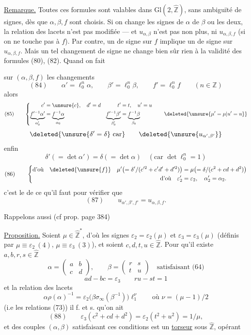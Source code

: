 \uline{Remarque.} Toutes ces formules sont valables dans $\mathrm{Gl}(2,\widehat{\mathbb Z})$, sans ambiguïté de signes, dès que $\alpha,\beta,f$ sont choisis. Si on change les signes de $\alpha$  de $\beta$ ou les deux, la relation des lacets n'est pas modifiée --- et $u_{\alpha,\beta}$ n'est pas  non plus,  ni $u_{\alpha,\beta,f}$ (si on ne touche pas à $f$). Par contre, un  de signe sur $f$ implique un  de signe sur $u_{\alpha,\beta,f}$. Mais un tel changement de signe ne change bien sûr rien à la validité des formules (80), (82). Quand on fait


sur $(\alpha,\beta,f)$ les changements 
\[
(84)\qquad
\alpha'=\ell_0^n\alpha,\qquad\beta'=\ell_0^n\beta,\qquad f'=\ell_0^n f
\qquad(n\in\mathbb Z)
\]
alors 
\[
(85)\qquad
\left\{\begin{aligned}
c'&=\unsure{c},\quad d'=d& t'&=t,\quad u'=u\\
\underbrace{f'^{-1}\alpha'}_{\alpha'_0}&=\underbrace{f^{-1}\alpha}_{\alpha_0}&
\underbrace{f'^{-1}\beta'}_{\beta'_0}&=\underbrace{f^{-1}\beta}_{\beta_0}
\end{aligned}\right.
\qquad\deleted{\unsure{\mu'=\mu|u'=u}}
\]
\[
\deleted{\unsure{\delta'=\delta}\text{ car}}
\qquad\deleted{\unsure{u_{\alpha',\beta'}}}
\]
enfin
\[
\delta'(=\det\alpha')=\delta(=\det\alpha)\quad(\text{car }\det \ell_0^n=1)
\]
\[
(86)\qquad
\left\{\begin{aligned}
\text{d'où}\quad\deleted{\unsure{f}}\quad
\mu'\bigl(=\delta'/(c'^2+c'd'+d'^2)\bigr)&=\mu\bigl(=\delta/(c^2+cd+d^2)\bigr)\\
\text{d'où}\quad\varepsilon'_2&=\varepsilon_2,\quad\alpha'_2=\alpha_2.
\end{aligned}\right.
\]
c'est le  de ce qu'il faut pour vérifier  que
\[
(87)\qquad u_{\alpha',\beta',f'}=u_{\alpha,\beta,f}.
\]

Rappelons aussi (cf prop. page 384)

\uline{Proposition.} Soient $\mu\in\widehat{\mathbb Z}^*$, d'où les signes $\varepsilon_2=\varepsilon_2(\mu)$ et $\varepsilon_3=\varepsilon_3(\mu)$ (définis par $\mu\equiv\varepsilon_2\ (4)$, $\mu\equiv\varepsilon_3\ (3)$), et soient $c,d,t,u\in\widehat{\mathbb Z}$. Pour qu'il existe $a,b,r,s\in\widehat{\mathbb Z}$
\[
\alpha=\begin{pmatrix}a&b\\c&d\end{pmatrix},\qquad
\beta=\begin{pmatrix}r&s\\t&u\end{pmatrix}
\quad\text{satisfaisant (64)}
\]
\[
ad-bc=\varepsilon_3\qquad ru-st=1
\]
et la relation des lacets
\[
\alpha\rho(\alpha)^{-1}=\varepsilon_2\bigl(\beta\sigma_\infty(\beta^{-1})\bigr)\ell_1^\nu
\qquad\text{où }\nu=(\mu-1)/2
\]
(i.e les relations (73)) il f. et s. qu'on ait
\[
(88)\qquad\varepsilon_3(c^2+cd+d^2)=\varepsilon_2(t^2+u^2)=1/\mu,
\]
et  des couples $(\alpha,\beta)$ satisfaisant ces conditions est un \uline{torseur} sous $\widehat{\mathbb Z}$, opérant

